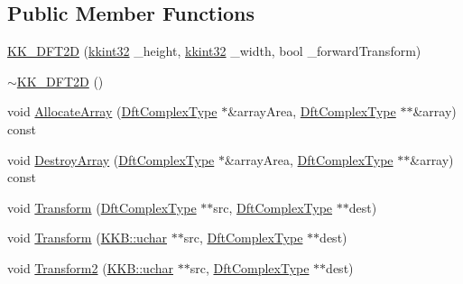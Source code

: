\subsection*{Public Member Functions}
\begin{DoxyCompactItemize}
\item 
\hyperlink{class_k_k_b_1_1_k_k___d_f_t2_d_a314db2b043cae5808e8ccc8d9dd6477c}{K\+K\+\_\+\+D\+F\+T2D} (\hyperlink{namespace_k_k_b_a8fa4952cc84fda1de4bec1fbdd8d5b1b}{kkint32} \+\_\+height, \hyperlink{namespace_k_k_b_a8fa4952cc84fda1de4bec1fbdd8d5b1b}{kkint32} \+\_\+width, bool \+\_\+forward\+Transform)
\item 
\hyperlink{class_k_k_b_1_1_k_k___d_f_t2_d_ad7290199b2d1a6e0d9d22be494885000}{$\sim$\+K\+K\+\_\+\+D\+F\+T2D} ()
\item 
void \hyperlink{class_k_k_b_1_1_k_k___d_f_t2_d_a465735c57e85444dd5f7d72dbb416a51}{Allocate\+Array} (\hyperlink{class_k_k_b_1_1_k_k___d_f_t2_d_a3277abaea54d0d88958f030092b9ac38}{Dft\+Complex\+Type} $\ast$\&array\+Area, \hyperlink{class_k_k_b_1_1_k_k___d_f_t2_d_a3277abaea54d0d88958f030092b9ac38}{Dft\+Complex\+Type} $\ast$$\ast$\&array) const 
\item 
void \hyperlink{class_k_k_b_1_1_k_k___d_f_t2_d_af5cf4a6e9954117f5cb14470bae40ebd}{Destroy\+Array} (\hyperlink{class_k_k_b_1_1_k_k___d_f_t2_d_a3277abaea54d0d88958f030092b9ac38}{Dft\+Complex\+Type} $\ast$\&array\+Area, \hyperlink{class_k_k_b_1_1_k_k___d_f_t2_d_a3277abaea54d0d88958f030092b9ac38}{Dft\+Complex\+Type} $\ast$$\ast$\&array) const 
\item 
void \hyperlink{class_k_k_b_1_1_k_k___d_f_t2_d_aa9bdc656e7af618c93047386e374e11b}{Transform} (\hyperlink{class_k_k_b_1_1_k_k___d_f_t2_d_a3277abaea54d0d88958f030092b9ac38}{Dft\+Complex\+Type} $\ast$$\ast$src, \hyperlink{class_k_k_b_1_1_k_k___d_f_t2_d_a3277abaea54d0d88958f030092b9ac38}{Dft\+Complex\+Type} $\ast$$\ast$dest)
\item 
void \hyperlink{class_k_k_b_1_1_k_k___d_f_t2_d_a81e7a20401bad3f639f134436f6917fb}{Transform} (\hyperlink{namespace_k_k_b_ace9969169bf514f9ee6185186949cdf7}{K\+K\+B\+::uchar} $\ast$$\ast$src, \hyperlink{class_k_k_b_1_1_k_k___d_f_t2_d_a3277abaea54d0d88958f030092b9ac38}{Dft\+Complex\+Type} $\ast$$\ast$dest)
\item 
void \hyperlink{class_k_k_b_1_1_k_k___d_f_t2_d_ac2cf3fc0e6ce95de671f86491d037b4e}{Transform2} (\hyperlink{namespace_k_k_b_ace9969169bf514f9ee6185186949cdf7}{K\+K\+B\+::uchar} $\ast$$\ast$src, \hyperlink{class_k_k_b_1_1_k_k___d_f_t2_d_a3277abaea54d0d88958f030092b9ac38}{Dft\+Complex\+Type} $\ast$$\ast$dest)
\end{DoxyCompactItemize}


